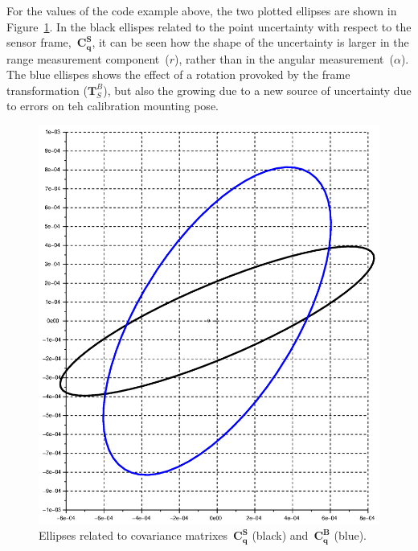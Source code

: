 For the values of the code example above, the two plotted ellipses are shown in Figure~\ref{fig:ellipses}. In the black ellispes related to the point uncertainty with respect to the sensor frame,~$\mathbf{C^S_q}$, it can be seen how the shape of the uncertainty is larger in the range measurement component~($r$), rather than in the angular measurement~($\alpha$). The blue ellispes shows the effect of a rotation provoked by the frame transformation ($\mathbf{T}^B_S$), but also the growing due to a new source of uncertainty due to errors on teh calibration mounting pose. 
\begin{figure}[bth!]
  \begin{center}
    \includegraphics[width=1.0\columnwidth]{figures/ellipses.eps}
    \caption{Ellipses related to covariance matrixes~$\mathbf{C^S_q}$ (black) and~$\mathbf{C^B_q}$ (blue).}
    \label{fig:ellipses}
  \end{center}
\end{figure}






